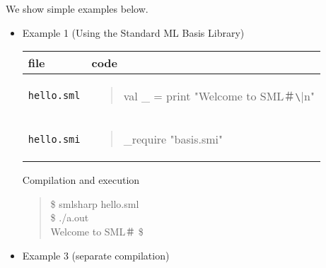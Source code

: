 \documentclass{jbook}
\newcommand{\code}[1]{\mbox{\large\tt #1}}
\newenvironment{program}{\begin{quote}\begin{tt}}%
                        {\end{tt}\end{quote}}
\begin{document}
\else%
	We show simple examples below.
\begin{itemize}
\item Example 1 (Using the Standard ML Basis Library)

\begin{tabular}{|l|l|}
\hline
file & code
\\\hline
\hline
\begin{minipage}{0.5\textwidth}
\code{hello.sml}
\end{minipage}
&
\begin{minipage}{0.5\textwidth}
\begin{program}
val \_ = print "Welcome to SML＃\verb|\|n"
\end{program}
\end{minipage}
\\\hline
\begin{minipage}{0.5\textwidth}
\code{hello.smi}
\end{minipage}
&
\begin{minipage}{0.5\textwidth}
\begin{program}
\_require "basis.smi"
\end{program}
\end{minipage}
\\\hline
\end{tabular}

Compilation and execution
\begin{program}
 \$ smlsharp hello.sml\\
 \$ ./a.out\\
 Welcome to SML＃
 \$
\end{program}

\item Example 3 (separate compilation)


\end{itemize}
\end{document}
